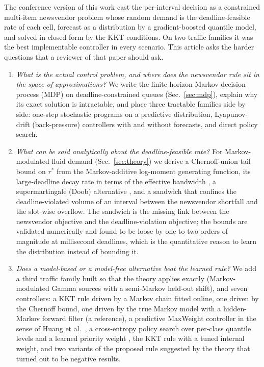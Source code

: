 \documentclass[journal]{IEEEtran}
\newcommand{\rstar}{r^{\ast}}
\begin{document}
The conference version of this work \cite{ncc2027} cast the per-interval decision as a constrained multi-item newsvendor problem whose random demand is the deadline-feasible rate of each cell, forecast as a distribution by a gradient-boosted quantile model, and solved in closed form by the KKT conditions. On two traffic families it was the best implementable controller in every scenario. This article asks the harder questions that a reviewer of that paper should ask.
\begin{enumerate}
\item \emph{What is the actual control problem, and where does the newsvendor rule sit in the space of approximations?} We write the finite-horizon Markov decision process (MDP) on deadline-constrained queues (Sec.~\ref{sec:mdp}), explain why its exact solution is intractable, and place three tractable families side by side: one-step stochastic programs on a predictive distribution, Lyapunov-drift (back-pressure) controllers with and without forecasts, and direct policy search.
\item \emph{What can be said analytically about the deadline-feasible rate?} For Markov-modulated fluid demand (Sec.~\ref{sec:theory}) we derive a Chernoff-union tail bound on $\rstar$ from the Markov-additive log-moment generating function, its large-deadline decay rate in terms of the effective bandwidth \cite{kesidis1993,chang1994,kelly1996}, a supermartingale (Doob) alternative \cite{duffield1994}, and a sandwich that confines the deadline-violated volume of an interval between the newsvendor shortfall and the slot-wise overflow. The sandwich is the missing link between the newsvendor objective and the deadline-violation objective; the bounds are validated numerically and found to be loose by one to two orders of magnitude at millisecond deadlines, which is the quantitative reason to learn the distribution instead of bounding it.
\item \emph{Does a model-based or a model-free alternative beat the learned rule?} We add a third traffic family built so that the theory applies exactly (Markov-modulated Gamma sources with a semi-Markov held-out shift), and seven controllers: a KKT rule driven by a Markov chain fitted online, one driven by the Chernoff bound, one driven by the true Markov model with a hidden-Markov forward filter (a reference), a predictive MaxWeight controller in the sense of Huang et al.\ \cite{huang2016}, a cross-entropy policy search over per-class quantile levels and a learned priority weight \cite{rubinstein1999}, the KKT rule with a tuned internal weight, and two variants of the proposed rule suggested by the theory that turned out to be negative results.

\end{enumerate}
\end{document}
